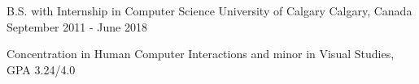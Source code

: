\begin{cventries}
  \cventry
    {B.S. with Internship in Computer Science}
    {University of Calgary}
    {Calgary, Canada}
    {September 2011 - June 2018}
    {
      \begin{cvitems}
      \item {Concentration in Human Computer Interactions and minor in Visual Studies, GPA 3.24/4.0}
      \end{cvitems}
    }
\end{cventries}
